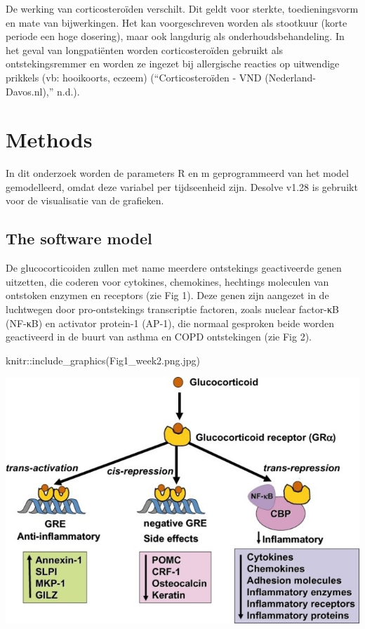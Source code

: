 \documentclass[
]{article}
\newenvironment{Shaded}{\begin{snugshade}}{\end{snugshade}}
\newcommand{\FunctionTok}[1]{\textcolor[rgb]{0.00,0.00,0.00}{#1}}
\newcommand{\NormalTok}[1]{#1}
\newcommand{\SpecialCharTok}[1]{\textcolor[rgb]{0.00,0.00,0.00}{#1}}
\newcommand{\StringTok}[1]{\textcolor[rgb]{0.31,0.60,0.02}{#1}}
\begin{document}
De werking van corticosteroïden verschilt. Dit geldt voor sterkte,
toedieningsvorm en mate van bijwerkingen. Het kan voorgeschreven worden
als stootkuur (korte periode een hoge dosering), maar ook langdurig als
onderhoudsbehandeling. In het geval van longpatiënten worden
corticosteroïden gebruikt als ontstekingsremmer en worden ze ingezet bij
allergische reacties op uitwendige prikkels (vb: hooikoorts, eczeem)
({``Corticosteroïden - VND (Nederland-Davos.nl),''} n.d.).

\hypertarget{methods}{%
\section{Methods}\label{methods}}

In dit onderzoek worden de parameters R en m geprogrammeerd van het
model gemodelleerd, omdat deze variabel per tijdseenheid zijn. Desolve
v1.28 is gebruikt voor de visualisatie van de grafieken.

\hypertarget{the-software-model}{%
\subsection{The software model}\label{the-software-model}}

De glucocorticoiden zullen met name meerdere ontstekings geactiveerde
genen uitzetten, die coderen voor cytokines, chemokines, hechtings
moleculen van ontstoken enzymen en receptors (zie Fig 1). Deze genen
zijn aangezet in de luchtwegen door pro-ontstekings transcriptie
factoren, zoals nuclear factor-κB (NF-κB) en activator protein-1 (AP-1),
die normaal gesproken beide worden geactiveerd in de buurt van asthma en
COPD ontstekingen (zie Fig 2).

\begin{Shaded}
\begin{Highlighting}[]
\NormalTok{knitr}\SpecialCharTok{::}\FunctionTok{include\_graphics}\NormalTok{(}\StringTok{\textquotesingle{}Fig1\_week2.png.jpg\textquotesingle{}}\NormalTok{)}
\end{Highlighting}
\end{Shaded}

\includegraphics{Fig1_week2.png.jpg}
\end{document}
